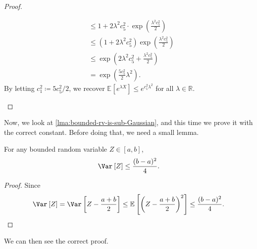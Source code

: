 \begin{proof}
\begin{itemize}
\begin{align*}
			       & \leq 1 + 2 \lambda ^2 c_5^2 \cdot \exp \left( \frac{\lambda ^2 c_5^2}{2} \right)                                                                                                                                                                                                                         \\
			       & \leq \left( 1 + 2 \lambda ^2 c_5^2 \right) \exp \left( \frac{\lambda ^2 c_5^2}{2} \right)                                                                                                                                                                                                                \\
			       & \leq \exp \left( 2\lambda ^2 c_5^2 + \frac{\lambda ^2 c_5^2}{2} \right) \tag*{\(1+x \leq e^x\)}                                                                                                                                                                                                          \\
			       & = \exp \left( \frac{5 c_5^2}{2} \lambda ^2 \right).
		      \end{align*}
		      By letting \(c_1^2 \coloneqq 5c_5^2 / 2\), we recover \(\mathbb{E}_{}\left[e^{\lambda X} \right] \leq e^{c_1^2 \lambda ^2}\) for all \(\lambda \in \mathbb{R} \).
	\end{itemize}
\end{proof}

Now, we look at \autoref{lma:bounded-rv-is-sub-Gaussian}, and this time we prove it with the correct constant. Before doing that, we need a small lemma.

\begin{lemma}\label{lma:variance-bound}
	For any bounded random variable \(Z\in [a, b]\),
	\[
		\Var_{}\left[Z \right] \leq \frac{(b-a)^2}{4}.
	\]
\end{lemma}
\begin{proof}
	Since
	\[
		\Var_{}\left[Z \right]
		= \Var_{}\left[Z - \frac{a+b}{2} \right]
		\leq \mathbb{E}_{}\left[\left( Z - \frac{a+b}{2} \right) ^2 \right]
		\leq \frac{(b-a)^2}{4}.
	\]
\end{proof}

We can then see the correct proof.

